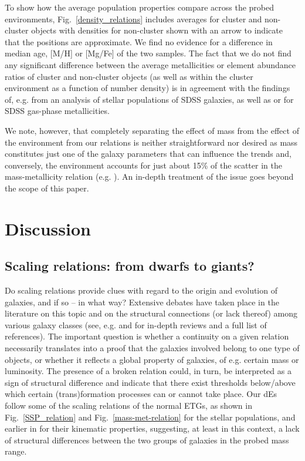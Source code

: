\documentclass[useAMS,usenatbib]{mn2e}
\begin{document}
To show how the average population properties compare across the probed environments,  Fig.~\ref{density_relations} includes averages for cluster and non-cluster objects with densities for non-cluster shown with an arrow to indicate that the positions are approximate. We find no evidence for a difference in median age, [M/H] or [Mg/Fe] of the two samples. The fact that we do not find any significant difference between the average metallicities or element abundance ratios of cluster and non-cluster objects (as well as within the cluster environment as a function of number density) is in agreement with the findings of, e.g. \cite{johansson:2012} from an analysis of stellar populations of SDSS galaxies, as well as \cite{cooper:2008} or \cite{ellison:2009} for SDSS gas-phase metallicities.

We note, however, that completely separating the effect of mass from the effect of the environment from our relations is neither straightforward nor desired as mass constitutes just one of the galaxy parameters that can influence the trends and, conversely, the environment accounts for just about 15\% of the scatter in the mass-metallicity relation (e.g. \citealt{cooper:2008}). An in-depth treatment of the issue goes beyond the scope of this paper.

\section{Discussion}

\subsection{Scaling relations: from dwarfs to giants?}

Do scaling relations provide clues with regard to the origin and evolution of galaxies, and if so -- in what way? Extensive debates have taken place in the literature on this topic and on the structural connections (or lack thereof) among various galaxy classes (see, e.g. \citealt{kormendy:2012} and \citealt{graham:2013} for in-depth reviews and a full list of references). The important question is whether a continuity on a given relation necessarily translates into a proof that the galaxies involved belong to one type of objects, or whether it reflects a global property of galaxies, of e.g. certain mass or luminosity. The presence of a broken relation could, in turn, be interpreted as a sign of structural difference and indicate that there exist thresholds below/above which certain (trans)formation processes can or cannot take place. Our dEs follow some of the scaling relations of the normal ETGs, as shown in Fig.~\ref{SSP_relation} and Fig.~\ref{mass-met-relation} for the stellar populations, and earlier in \cite{rys:2014} for their kinematic properties, suggesting, at least in this context, a lack of structural differences between the two groups of galaxies in the probed mass range.
\end{document}

